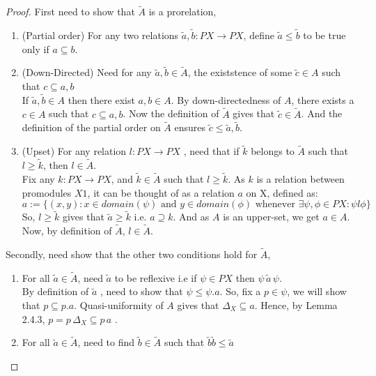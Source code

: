 \documentclass[18pt,a4paper]{article}
\makeatletter
\theoremstyle{definition}
\newcommand{\carrow}{}%
\DeclareRobustCommand{\carrow}{%
	\mathrel{\vphantom{\rightarrow}\mathpalette\circle@arrow\relax}%
}
\newcommand{\circle@arrow}[2]{%
	\m@th
	\ooalign{%
		\hidewidth$#1\circ\mkern1mu$\hidewidth\cr
	$#1\longrightarrow$\cr}%
}
\makeatother
\begin{document}
\begin{proof}\setcounter{equation}{0}

	First need to show that $\tilde{A}$ is a prorelation,
	\begin{enumerate}[label=(\roman*)]
		\item (Partial order) For any two relations $\tilde{a},\tilde{b}:PX \to PX $,
			define $ \tilde{a} \leq \tilde{b}$ to be true only if $a \subseteq b$.
		\item(Down-Directed) Need for any $\tilde{a} ,\tilde{b} \in \tilde{A}$,
			the existstence of some $\tilde{c} \in A$ such that $c \subseteq a,b$\\
			If $\tilde{a} ,\tilde{b} \in A$ then there exist $a,b \in A$. By down-directedness
			of $A$, there exists a $c \in A$ such that  $c \subseteq a,b$. Now the definition
			of $\tilde{A}$ gives that $\tilde{c} \in \tilde{A}$. And the definition of the
			partial order on $\tilde{A}$ ensures $\tilde{c} \leq \tilde{a} ,\tilde{b}$.
		\item (Upset) For any relation $l:PX \to PX$ , need that if  $\tilde{k}$ belongs to
			$\tilde{A}$ such that $l \geq \tilde{k}$, then $l \in \tilde{A}$.\\
			Fix any $k:PX \to PX$, and $\tilde{k} \in \tilde{A}$ such that $l\geq \tilde{k} $.
			As $k$ is a relation between promodules $X \carrow 1$, it can be thought
			of as a relation $a$ on X, defined as:
			\[a:=\{(x,y): x \in domain(\psi) \text{ and }y \in domain(\phi)
			\text{ whenever } \exists \psi,\phi \in PX: \psi l \phi\}\]
			So, $l\geq \tilde{k}$ gives that $\tilde{a}\geq \tilde{k}$ i.e. $a \supseteq k.$
			And as $A$ is an upper-set, we get $a\in A$. Now, by definition of $\tilde{A}$,
			$l \in \tilde{A}$.
	\end{enumerate}
	Secondly, need show that the other two conditions hold for $\tilde{A}$,
	\begin{enumerate}[label=(\roman*)]
		\item For all $\tilde{a} \in \tilde{A}$, need $\tilde{a}$ to be reflexive i.e
			if $\psi \in PX$ then $\psi \, \tilde{a} \, \psi$.\\
			By definition of $\tilde{a}$ , need to show that $\psi \leq \psi.a$.
			So, fix a $p \in \psi$, we will show that $p \subseteq p.a$.
			Quasi-uniformity of $A$ gives that $\Delta_X \subseteq a$. Hence, by Lemma 2.4.3,
			$p=p \, \Delta_X \subseteq p \,a$ .
		\item For all $\tilde{a} \in \tilde{A}$, need to find $\tilde{b}\in \tilde{A}$ such that
			$\tilde{b}\tilde{b} \leq \tilde{a} $\\

\end{enumerate}
\end{proof}
\end{document}
